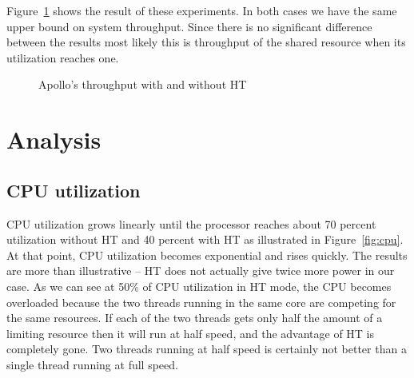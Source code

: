 \documentclass[12pt]{article}
\begin{document}
Figure~\ref{fig:load} shows the result of these experiments. In both cases we have the same upper bound on system throughput. Since there is no significant difference between the results most likely this is throughput of the shared resource when its utilization reaches one.

\begin{figure}[h]
    \centering
	\caption{Apollo's throughput with and without HT}
    \label{fig:load}
\end{figure}

\section{Analysis}

\subsection{CPU utilization}

CPU utilization grows linearly until the processor reaches about 70 percent utilization without HT and 40 percent with HT as illustrated in Figure~\ref{fig:cpu}. At that point, CPU utilization becomes exponential and rises quickly. The results are more than illustrative -- HT does not actually give twice more power in our case. As we can see at 50\% of CPU utilization in HT mode, the CPU becomes overloaded because the two threads running in the same core are competing for the same resources. If each of the two threads gets only half the amount of a limiting resource then it will run at half speed, and the advantage of HT is completely gone. Two threads running at half speed is certainly not better than a single thread running at full speed.
\end{document}
